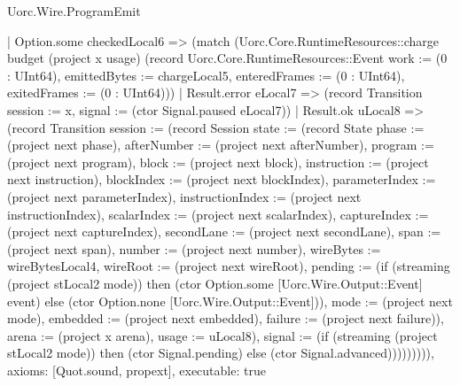 \begin{lexlean}{Uorc.Wire.ProgramEmit}
\begin{semanticmodule}
{      | Option.some checkedLocal6 => (match (Uorc.Core.RuntimeResources::charge budget (project x usage) (record Uorc.Core.RuntimeResources::Event {work := (0 : UInt64), emittedBytes := chargeLocal5, enteredFrames := (0 : UInt64), exitedFrames := (0 : UInt64)}))
        | Result.error eLocal7 => (record Transition {session := x, signal := (ctor Signal.paused eLocal7)})
        | Result.ok uLocal8 => (record Transition {session := (record Session {state := (record State {phase := (project next phase), afterNumber := (project next afterNumber), program := (project next program), block := (project next block), instruction := (project next instruction), blockIndex := (project next blockIndex), parameterIndex := (project next parameterIndex), instructionIndex := (project next instructionIndex), scalarIndex := (project next scalarIndex), captureIndex := (project next captureIndex), secondLane := (project next secondLane), span := (project next span), number := (project next number), wireBytes := wireBytesLocal4, wireRoot := (project next wireRoot), pending := (if (streaming (project stLocal2 mode)) then (ctor Option.some [Uorc.Wire.Output::Event] event) else (ctor Option.none [Uorc.Wire.Output::Event])), mode := (project next mode), embedded := (project next embedded), failure := (project next failure)}), arena := (project x arena), usage := uLocal8}), signal := (if (streaming (project stLocal2 mode)) then (ctor Signal.pending) else (ctor Signal.advanced))}))))))),
  axioms: [Quot.sound, propext],
  executable: true
}


\end{semanticmodule}
\end{lexlean}
